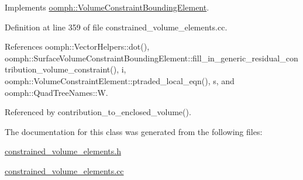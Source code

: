 Implements \hyperlink{classoomph_1_1VolumeConstraintBoundingElement_a717f1085709bd8820b8043ff94ecb0c5}{oomph\+::\+Volume\+Constraint\+Bounding\+Element}.



Definition at line 359 of file constrained\+\_\+volume\+\_\+elements.\+cc.



References oomph\+::\+Vector\+Helpers\+::dot(), oomph\+::\+Surface\+Volume\+Constraint\+Bounding\+Element\+::fill\+\_\+in\+\_\+generic\+\_\+residual\+\_\+contribution\+\_\+volume\+\_\+constraint(), i, oomph\+::\+Volume\+Constraint\+Element\+::ptraded\+\_\+local\+\_\+eqn(), s, and oomph\+::\+Quad\+Tree\+Names\+::W.



Referenced by contribution\+\_\+to\+\_\+enclosed\+\_\+volume().



The documentation for this class was generated from the following files\+:\begin{DoxyCompactItemize}
\item 
\hyperlink{constrained__volume__elements_8h}{constrained\+\_\+volume\+\_\+elements.\+h}\item 
\hyperlink{constrained__volume__elements_8cc}{constrained\+\_\+volume\+\_\+elements.\+cc}\end{DoxyCompactItemize}
